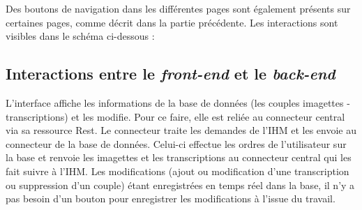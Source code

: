 Des boutons de navigation dans les différentes pages sont également présents sur certaines pages, comme décrit dans la partie précédente. Les interactions sont visibles dans le schéma ci-dessous :


\subsection{Interactions entre le \textit{front-end} et le \textit{back-end}}

L’interface affiche les informations de la base de données (les couples imagettes - transcriptions) et les modifie. Pour ce faire, elle est reliée au connecteur central via sa ressource Rest. Le connecteur traite les demandes de l’IHM et les envoie au connecteur de la base de données. Celui-ci effectue les ordres de l’utilisateur sur la base et renvoie les imagettes et les transcriptions au connecteur central qui les fait suivre à l’IHM. Les modifications (ajout ou modification d’une transcription ou suppression d’un couple) étant enregistrées en temps réel dans la base, il n’y a pas besoin d’un bouton pour enregistrer les modifications à l’issue du travail.
